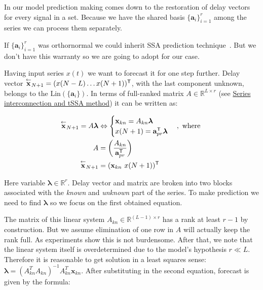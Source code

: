 	In our model prediction making comes down to the restoration of delay vectors for every signal in a set. Because we have the shared basis $ \{\mathbf{a}_i\}_{i = 1}^r $ among the series we can process them separately. 
	
	If $ \{\mathbf{a}_i\}_{i = 1}^r $ was orthornormal we could inherit SSA prediction technique~\cite{ecfb9dc578be43ae9ee8fc88b8ff9151}. But we don't have this warranty so we are going to adopt for our case.
	
	Having input series $ x(t) $ we want to forecast it for one step further. Delay vector $ \overset{\leftarrow}{\mathbf{x}}_{N + 1} = (x(N - L) \ldots x(N + 1))^{\mathsf{T}} $, with the last component unknown, belongs to the $ \text{Lin}(\{\mathbf{a}_i\}) $. In terms of full-ranked matrix $ A \in \mathbb{R}^{L \times r} $ (see \hyperref[sec:tssa_method]{Series interconnection and tSSA method}) it can be written as:
	
	\begin{align}\label{eq:main_pred_for_A}
		\overset{\leftarrow}{\mathbf{x}}_{N + 1} = A \boldsymbol{\lambda} &\Leftrightarrow \begin{cases}
			\mathbf{x}_{kn} = A_{kn} \boldsymbol{\lambda}  \\
			x(N + 1) = \mathbf{a}_{pr}^{\mathsf{T}} \boldsymbol{\lambda}
		\end{cases}, \text{ where } \\
		A &= \left( \dfrac{A_{kn}}{\mathbf{a}_{pr}^{\mathsf{T}}} \right) \nonumber \\
		\overset{\leftarrow}{\mathbf{x}}_{N + 1} &= (\mathbf{x}_{kn} \  x(N + 1))^{\mathsf{T}} \nonumber
	\end{align}
	
	Here variable $ \boldsymbol{\lambda} \in \mathbb{R}^r $. Delay vector and matrix are broken into two blocks associated with the \emph{known} and \emph{unknown} part of the series. To make prediction we need to find $ \boldsymbol{\lambda} $ so we focus on the first obtained equation.
	
	The matrix of this linear system $ A_{kn} \in \mathbb{R}^{(L - 1) \times r} $ has a rank at least $ r - 1 $ by construction. But we assume elimination of one row in $ A $ will actually keep the rank full. As experiments show this is not burdensome. After that, we note that the linear system itself is overdetermined due to the model's hypothesis $ r \ll L $. Therefore it is reasonable to get solution in a least squares sense: $ \boldsymbol{\lambda} = (A_{kn}^T A_{kn})^{-1} A_{kn}^T \mathbf{x}_{kn} $. After substituting in the second equation, forecast is given by the formula:
	
